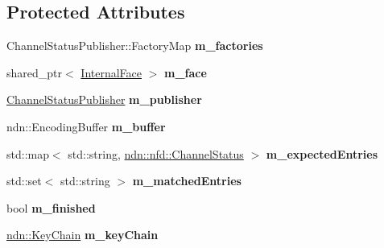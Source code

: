 \subsection*{Protected Attributes}
\begin{DoxyCompactItemize}
\item 
Channel\+Status\+Publisher\+::\+Factory\+Map {\bfseries m\+\_\+factories}\hypertarget{classnfd_1_1tests_1_1ChannelStatusPublisherFixture_a550957774676e315bc8ace99410c6173}{}\label{classnfd_1_1tests_1_1ChannelStatusPublisherFixture_a550957774676e315bc8ace99410c6173}

\item 
shared\+\_\+ptr$<$ \hyperlink{classnfd_1_1InternalFace}{Internal\+Face} $>$ {\bfseries m\+\_\+face}\hypertarget{classnfd_1_1tests_1_1ChannelStatusPublisherFixture_ab556be62055f257eee4fe7641815eff8}{}\label{classnfd_1_1tests_1_1ChannelStatusPublisherFixture_ab556be62055f257eee4fe7641815eff8}

\item 
\hyperlink{classnfd_1_1ChannelStatusPublisher}{Channel\+Status\+Publisher} {\bfseries m\+\_\+publisher}\hypertarget{classnfd_1_1tests_1_1ChannelStatusPublisherFixture_a103a310e76da1828da384671a3c99067}{}\label{classnfd_1_1tests_1_1ChannelStatusPublisherFixture_a103a310e76da1828da384671a3c99067}

\item 
ndn\+::\+Encoding\+Buffer {\bfseries m\+\_\+buffer}\hypertarget{classnfd_1_1tests_1_1ChannelStatusPublisherFixture_adac71ae14f3dc5f9b7c49ca155d0e911}{}\label{classnfd_1_1tests_1_1ChannelStatusPublisherFixture_adac71ae14f3dc5f9b7c49ca155d0e911}

\item 
std\+::map$<$ std\+::string, \hyperlink{classndn_1_1nfd_1_1ChannelStatus}{ndn\+::nfd\+::\+Channel\+Status} $>$ {\bfseries m\+\_\+expected\+Entries}\hypertarget{classnfd_1_1tests_1_1ChannelStatusPublisherFixture_a91eeb2ee4097ce970992fa1195d04bd6}{}\label{classnfd_1_1tests_1_1ChannelStatusPublisherFixture_a91eeb2ee4097ce970992fa1195d04bd6}

\item 
std\+::set$<$ std\+::string $>$ {\bfseries m\+\_\+matched\+Entries}\hypertarget{classnfd_1_1tests_1_1ChannelStatusPublisherFixture_a23de8380d09e3c21591aedd0db02b2d9}{}\label{classnfd_1_1tests_1_1ChannelStatusPublisherFixture_a23de8380d09e3c21591aedd0db02b2d9}

\item 
bool {\bfseries m\+\_\+finished}\hypertarget{classnfd_1_1tests_1_1ChannelStatusPublisherFixture_ad2eedc248b9da34994448bdc82d72b28}{}\label{classnfd_1_1tests_1_1ChannelStatusPublisherFixture_ad2eedc248b9da34994448bdc82d72b28}

\item 
\hyperlink{classndn_1_1security_1_1KeyChain}{ndn\+::\+Key\+Chain} {\bfseries m\+\_\+key\+Chain}\hypertarget{classnfd_1_1tests_1_1ChannelStatusPublisherFixture_a3361b34222a5fb622fc852d64f44da20}{}\label{classnfd_1_1tests_1_1ChannelStatusPublisherFixture_a3361b34222a5fb622fc852d64f44da20}

\end{DoxyCompactItemize}


